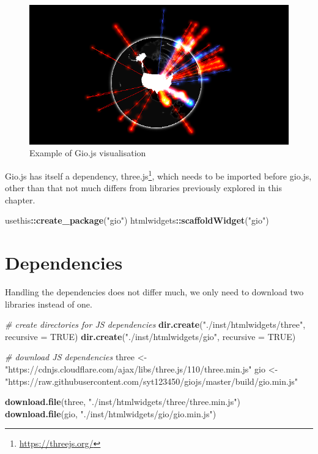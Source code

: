 \documentclass[
]{krantz}
\makeatletter
\newenvironment{Shaded}{\begin{snugshade}}{\end{snugshade}}
\newcommand{\CommentTok}[1]{\textcolor[rgb]{0.37,0.37,0.37}{\textit{#1}}}
\newcommand{\DataTypeTok}[1]{\textcolor[rgb]{0.27,0.27,0.27}{#1}}
\newcommand{\KeywordTok}[1]{\textcolor[rgb]{0.27,0.27,0.27}{\textbf{#1}}}
\newcommand{\NormalTok}[1]{#1}
\newcommand{\OperatorTok}[1]{\textcolor[rgb]{0.43,0.43,0.43}{\textbf{#1}}}
\newcommand{\OtherTok}[1]{\textcolor[rgb]{0.37,0.37,0.37}{#1}}
\newcommand{\StringTok}[1]{\textcolor[rgb]{0.5,0.5,0.5}{#1}}
\renewcommand{\href}[2]{#2\footnote{\url{#1}}}
\newenvironment{kframe}{%
\medskip{}
\setlength{\fboxsep}{.8em}
 \def\at@end@of@kframe{}%
 \ifinner\ifhmode%
  \def\at@end@of@kframe{\end{minipage}}%
  \begin{minipage}{\columnwidth}%
 \fi\fi%
 \def\FrameCommand##1{\hskip\@totalleftmargin \hskip-\fboxsep
 \colorbox{shadecolor}{##1}\hskip-\fboxsep
     \hskip-\linewidth \hskip-\@totalleftmargin \hskip\columnwidth}%
 \MakeFramed {\advance\hsize-\width
   \@totalleftmargin\z@ \linewidth\hsize
   \@setminipage}}%
 {\par\unskip\endMakeFramed%
 \at@end@of@kframe}
\renewenvironment{Shaded}{\begin{kframe}}{\end{kframe}}
\makeatother
\begin{document}
\begin{figure}
\centering
\includegraphics{images/gio-example.png}
\caption{Example of Gio.js visualisation}
\end{figure}

Gio.js has itself a dependency, \href{https://threejs.org/}{three.js}, which needs to be imported before gio.js, other than that not much differs from libraries previously explored in this chapter.

\begin{Shaded}
\begin{Highlighting}[]
\NormalTok{usethis}\OperatorTok{::}\KeywordTok{create\_package}\NormalTok{(}\StringTok{"gio"}\NormalTok{)}
\NormalTok{htmlwidgets}\OperatorTok{::}\KeywordTok{scaffoldWidget}\NormalTok{(}\StringTok{"gio"}\NormalTok{)}
\end{Highlighting}
\end{Shaded}

\hypertarget{dependencies-1}{%
\section*{Dependencies}\label{dependencies-1}}


Handling the dependencies does not differ much, we only need to download two libraries instead of one.

\begin{Shaded}
\begin{Highlighting}[]
\CommentTok{\# create directories for JS dependencies}
\KeywordTok{dir.create}\NormalTok{(}\StringTok{"./inst/htmlwidgets/three"}\NormalTok{, }\DataTypeTok{recursive =} \OtherTok{TRUE}\NormalTok{)}
\KeywordTok{dir.create}\NormalTok{(}\StringTok{"./inst/htmlwidgets/gio"}\NormalTok{, }\DataTypeTok{recursive =} \OtherTok{TRUE}\NormalTok{)}

\CommentTok{\# download JS dependencies}
\NormalTok{three \textless{}{-}}\StringTok{ "https://cdnjs.cloudflare.com/ajax/libs/three.js/110/three.min.js"}
\NormalTok{gio \textless{}{-}}\StringTok{ "https://raw.githubusercontent.com/syt123450/giojs/master/build/gio.min.js"}

\KeywordTok{download.file}\NormalTok{(three, }\StringTok{"./inst/htmlwidgets/three/three.min.js"}\NormalTok{)}
\KeywordTok{download.file}\NormalTok{(gio, }\StringTok{"./inst/htmlwidgets/gio/gio.min.js"}\NormalTok{)}
\end{Highlighting}
\end{Shaded}
\end{document}
